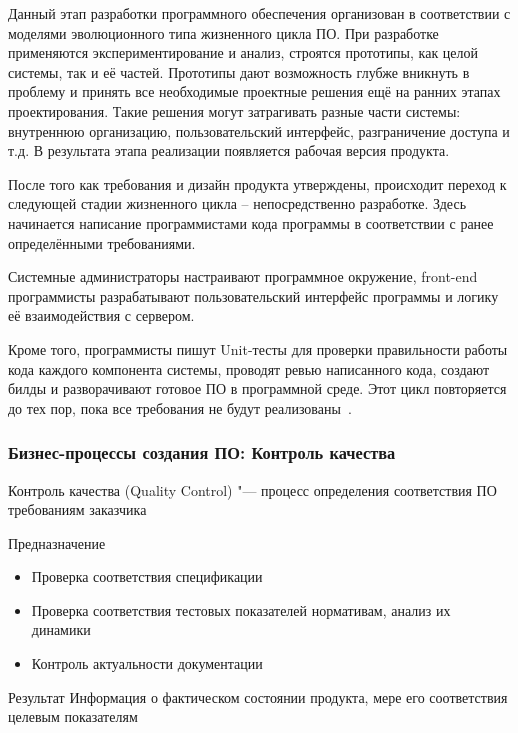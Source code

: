 \documentclass{../industrial-development}
\begin{document}
Данный этап разработки программного обеспечения организован в соответствии с моделями эволюционного типа жизненного цикла ПО. При разработке применяются экспериментирование и анализ, строятся прототипы, как целой системы, так и её частей. Прототипы дают возможность глубже вникнуть в проблему и принять все необходимые проектные решения ещё на ранних этапах проектирования. Такие решения могут затрагивать разные части системы: внутреннюю организацию, пользовательский интерфейс, разграничение доступа и т.д. В результата этапа реализации появляется рабочая версия продукта.

После того как требования и дизайн продукта утверждены, происходит переход к следующей стадии жизненного цикла – непосредственно разработке. Здесь начинается написание программистами кода программы в соответствии с ранее определёнными требованиями.

Системные администраторы настраивают программное окружение, front-end программисты разрабатывают пользовательский интерфейс программы и логику её взаимодействия с сервером.

Кроме того, программисты пишут Unit-тесты для проверки правильности работы кода каждого компонента системы, проводят ревью написанного кода, создают билды и разворачивают готовое ПО в программной среде. Этот цикл повторяется до тех пор, пока все требования не будут реализованы~\cite{Abolut,Qalight}.


\begin{frame} \frametitle{Бизнес-процессы создания ПО: Контроль качества}
	\begin{block}{}
		\alert{Контроль качества} (Quality Control) "--- процесс определения соответствия ПО требованиям заказчика
	\end{block}
	\begin{block}{Предназначение}
		\begin{itemize}
			\item Проверка соответствия спецификации
			\item Проверка соответствия тестовых показателей нормативам, анализ их динамики
			\item Контроль актуальности документации
		\end{itemize}
	\end{block}
	\begin{block}{Результат}
		Информация о фактическом состоянии продукта, мере его соответствия целевым показателям
	\end{block}
\end{frame}
\end{document}
